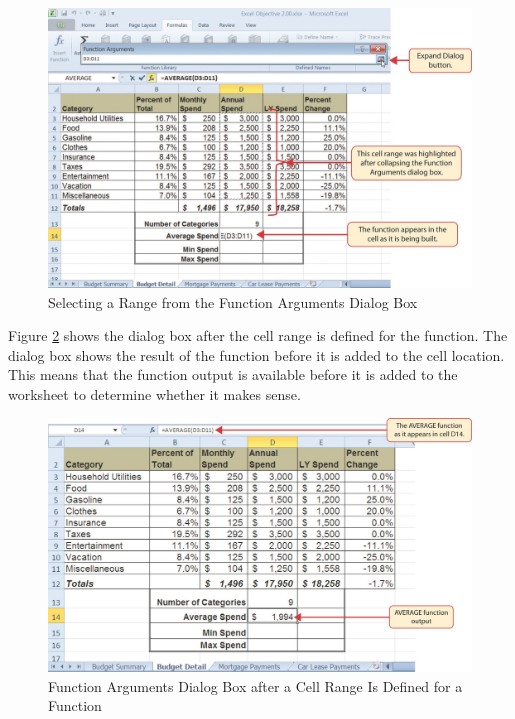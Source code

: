 \begin{figure}[H]
	\centering
	\includegraphics[width=\maxwidth{.95\linewidth}]{gfx/ch02_fig21}
	\caption{Selecting a Range from the Function Arguments Dialog Box}
	\label{02:fig21}
\end{figure}

Figure \ref{02:fig22} shows the  dialog box after the cell range is defined for the  function. The dialog box shows the result of the function before it is added to the cell location. This means that the function output is available before it is added to the worksheet to determine whether it makes sense.

\begin{figure}[H]
	\centering
	\includegraphics[width=\maxwidth{.95\linewidth}]{gfx/ch02_fig22}
	\caption{Function Arguments Dialog Box after a Cell Range Is Defined for a Function}
	\label{02:fig22}
\end{figure}

